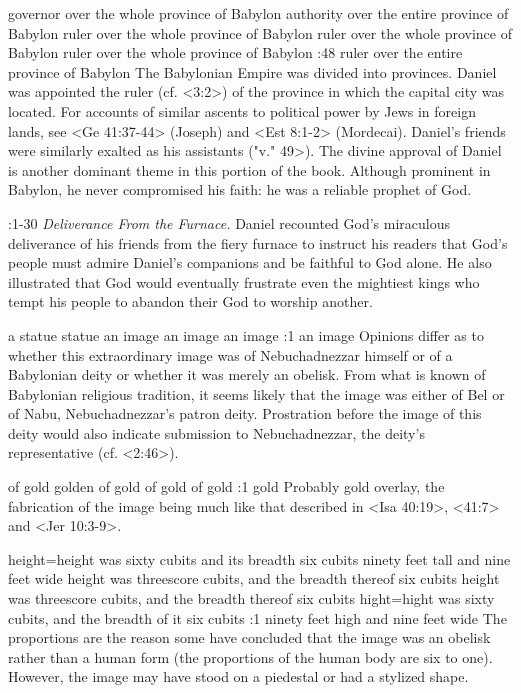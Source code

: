     {governor over the whole province of Babylon} %
    {authority over the entire province of Babylon} %
    {ruler over the whole province of Babylon} %
    {ruler over the whole province of Babylon} %
    {ruler over the whole province of Babylon} %
:48 {ruler over the entire province of Babylon} The Babylonian Empire was divided into
provinces. Daniel was appointed the  
ruler (cf. <3:2>) of the province in which the capital city was located. 
For accounts of similar ascents to political power by Jews in foreign 
lands, see <Ge 41:37-44> (Joseph)
and <Est 8:1-2> (Mordecai). 
Daniel's friends were similarly exalted as his assistants (\<"v." 49>). The 
divine approval of Daniel is another dominant theme in this portion of the book. Although prominent
in Babylon, he never compromised his faith: he was a reliable prophet of God.

:1-30 {} {\it Deliverance From the Furnace.\/} Daniel recounted God's 
miraculous deliverance of his friends from the fiery furnace to instruct his readers that God's
people must admire Daniel's companions and be faithful to God alone. He also illustrated that God 
would eventually frustrate even the mightiest kings who tempt his 
people to abandon their God to worship another.

    {a statue} %
    {statue} %
    {an image} %
    {an image} %
    {an image} %
:1 {an image} Opinions differ as to whether this extraordinary 
image was of Nebuchadnezzar himself or of a Babylonian deity or 
whether it was merely an obelisk. From what is known of Babylonian religious tradition, it seems
likely that the image was either of  
Bel or of Nabu, Nebuchadnezzar's patron deity. Prostration before 
the image of this deity would also indicate submission to Nebuchadnezzar, the deity's representative
(cf. <2:46>).

    {of gold} %
    {golden} %
    {of gold} %
    {of gold} %
    {of gold} %
:1 {gold} Probably  
gold overlay, the fabrication of the image being much like that described in <Isa 40:19>, <41:7> and
<Jer 10:3-9>.


    {height}={height was sixty cubits and its breadth six cubits} %
    {ninety feet tall and nine feet wide} %
    {height was threescore cubits, and the breadth thereof six cubits} %
    {height was threescore cubits, and the breadth thereof six cubits} %
    {hight}={hight was sixty cubits, and the breadth of it six cubits} %
:1 {ninety feet high and nine feet wide} The proportions are the reason some have 
concluded that the image was an obelisk rather than a human form 
(the proportions of the human body are six to one). However, the 
image may have stood on a piedestal or had a stylized shape. 


